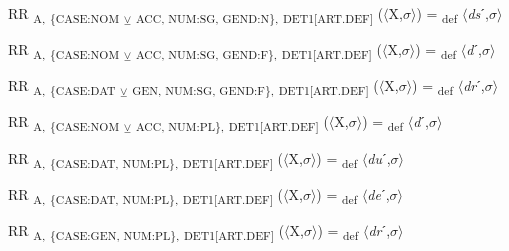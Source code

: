 {\begin{exe}
 RR \textsubscript{A,} \textsubscript{\{CASE:NOM} \textsubscript{${\veebar}$}\textsubscript{ ACC, NUM:SG, GEND:N\},} \textsubscript{DET1[ART.DEF]} ($\langle$X,$\sigma $$\rangle$) = \textsubscript{def} $\langle$\textit{ds}ˊ,$\sigma $$\rangle$
\end{exe}

\begin{exe}
 RR \textsubscript{A,} \textsubscript{\{CASE:NOM} \textsubscript{${\veebar}$}\textsubscript{ ACC, NUM:SG, GEND:F\},} \textsubscript{DET1[ART.DEF]} ($\langle$X,$\sigma $$\rangle$) = \textsubscript{def} $\langle$\textit{d}ˊ,$\sigma $$\rangle$
\end{exe}

\begin{exe}
 RR \textsubscript{A,} \textsubscript{\{CASE:DAT} \textsubscript{${\veebar}$}\textsubscript{ GEN, NUM:SG, GEND:F\},} \textsubscript{DET1[ART.DEF]} ($\langle$X,$\sigma $$\rangle$) = \textsubscript{def} $\langle$\textit{dr}ˊ,$\sigma $$\rangle$
\end{exe}

\begin{exe}
 RR \textsubscript{A,} \textsubscript{\{CASE:NOM} \textsubscript{${\veebar}$}\textsubscript{ ACC, NUM:PL\},} \textsubscript{DET1[ART.DEF]} ($\langle$X,$\sigma $$\rangle$) = \textsubscript{def} $\langle$\textit{d}ˊ,$\sigma $$\rangle$
\end{exe}

\begin{exe}
 RR \textsubscript{A,} \textsubscript{\{CASE:DAT, NUM:PL\},} \textsubscript{DET1[ART.DEF]} ($\langle$X,$\sigma $$\rangle$) = \textsubscript{def} $\langle$\textit{du}ˊ,$\sigma $$\rangle$
\end{exe}

\begin{exe}
 RR \textsubscript{A,} \textsubscript{\{CASE:DAT, NUM:PL\},} \textsubscript{DET1[ART.DEF]} ($\langle$X,$\sigma $$\rangle$) = \textsubscript{def} $\langle$\textit{de}ˊ,$\sigma $$\rangle$
\end{exe}

\begin{exe}
 RR \textsubscript{A,} \textsubscript{\{CASE:GEN, NUM:PL\},} \textsubscript{DET1[ART.DEF]} ($\langle$X,$\sigma $$\rangle$) = \textsubscript{def} $\langle$\textit{dr}ˊ,$\sigma $$\rangle$
\end{exe}

}
